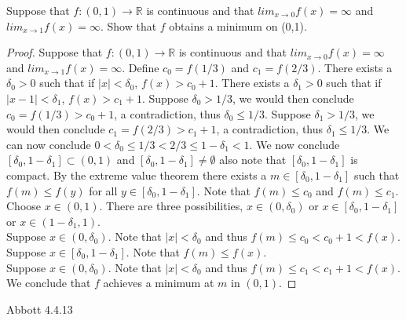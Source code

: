 \documentclass[12pt]{article}
\makeatletter
\theoremstyle{homework}
\newenvironment{exercise}[1]
{\def\@currentlabel{#1}\exercisecore}
{\endexercisecore}
\makeatother
\begin{document}
\begin{exercise} 5
Suppose that $f : (0,1) \rightarrow\mathbb{R}$ is continuous and that $lim_{x\rightarrow 0} f (x) = \infty$ and $lim_{x\rightarrow 1} f (x) = \infty$. Show that $f$ obtains a minimum on (0,1).
\end{exercise}
\begin{proof}
Suppose that $f : (0,1) \rightarrow\mathbb{R}$ is continuous and that $lim_{x\rightarrow 0} f (x) = \infty$ and $lim_{x\rightarrow 1} f (x) = \infty$.  Define $c_0=f(1/3)$ and $c_1=f(2/3)$.  There exists a $\delta_0>0$ such that if $|x|<\delta_0$, $f(x)>c_0+1$.  There exists a $\delta_1>0$ such that if $|x-1|<\delta_1$, $f(x)>c_1+1$.  Suppose $\delta_0> 1/3$, we would then conclude $c_0=f(1/3)>c_0+1$, a contradiction, thus $\delta_0\leq 1/3$.  Suppose $\delta_1> 1/3$, we would then conclude $c_1=f(2/3)>c_1+1$, a contradiction, thus $\delta_1\leq 1/3$.  We can now conclude $0<\delta_0\leq 1/3<2/3\leq 1-\delta_1<1$.  We now conclude $[\delta_0,1-\delta_1]\subset (0,1)$ and $[\delta_0,1-\delta_1]\neq \emptyset$ also note that $[\delta_0,1-\delta_1]$ is compact.  By the extreme value theorem there exists a $m\in [\delta_0,1-\delta_1]$ such that $f(m)\leq f(y)$ for all $y\in [\delta_0,1-\delta_1]$.  Note that $f(m)\leq c_0$ and $f(m)\leq c_1$.\\
Choose $x\in (0,1)$.  There are three possibilities, $x\in(0,\delta_0)$ or $x\in [\delta_0,1-\delta_1]$ or $x\in(1-\delta_1,1)$.\\
Suppose $x\in(0,\delta_0)$.  Note that $|x|<\delta_0$ and thus $f(m)\leq c_0<c_0+1<f(x)$.\\
Suppose $x\in[\delta_0,1-\delta_1]$.  Note that $f(m)\leq f(x)$.\\
Suppose $x\in(0,\delta_0)$.  Note that $|x|<\delta_0$ and thus $f(m)\leq c_1<c_1+1<f(x)$.\\
We conclude that $f$ achieves a minimum at $m$ in $(0,1)$.
\end{proof}
\begin{exercise} 6
Abbott 4.4.13
\end{exercise}
\end{document}
